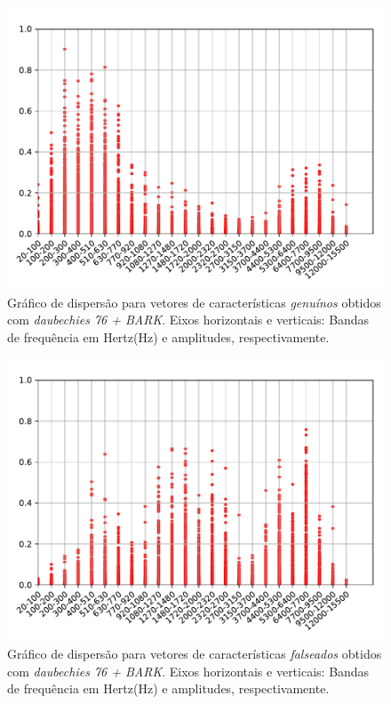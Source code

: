 \begin{figure}[H]
	\centering
	\includegraphics[scale=.8]{./images/results/barkVersusMel/Genuine_daub76_Bark.pdf}
	\caption{Gráfico de dispersão para vetores de características \textit{genuínos} obtidos com \textit{daubechies 76 + BARK}.  Eixos horizontais e verticais: Bandas de frequência em Hertz(Hz) e amplitudes, respectivamente.}
	\label{fig:livedaub76bark}
\end{figure}
\begin{figure}[H]
	\centering
	\includegraphics[scale=.8]{./images/results/barkVersusMel/Spoofing_daub76_Bark.pdf}
	\caption{Gráfico de dispersão para vetores de características \textit{falseados} obtidos com \textit{daubechies 76 + BARK}.  Eixos horizontais e verticais: Bandas de frequência em Hertz(Hz) e amplitudes, respectivamente.}
	\label{fig:spoofingdaub76bark}
\end{figure}
